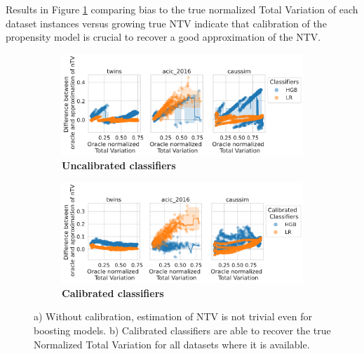 \documentclass{report}
\begin{document}
\begin{appendices}
  Results in Figure \ref{apd:overlap:ntv_approximation} comparing bias to the true
  normalized Total Variation of each dataset instances versus growing true NTV
  indicate that calibration of the propensity model is crucial to recover a good
  approximation of the NTV.




  \begin{figure}
    \begin{subfigure}[b]{\textwidth}
      \centering
      \caption{\textbf{Uncalibrated classifiers}}
      \includegraphics[width=\linewidth]{img/chapter_5/overlap_measure_diff_oracle_ntv_to_n_tv_calibration=False_vs_oracle_n_tv.pdf}
    \end{subfigure}
    \begin{subfigure}[b]{\textwidth}
      \centering
      \caption{\textbf{Calibrated
          classifiers}}
      \includegraphics[width=\linewidth]{img/chapter_5/overlap_measure_diff_oracle_ntv_to_n_tv_calibration=True_vs_oracle_n_tv.pdf}
    \end{subfigure}
    \caption{a) Without calibration, estimation of NTV is not trivial even for
      boosting models. b) Calibrated classifiers are able to recover the true
      Normalized Total Variation for all datasets where it is
      available.}\label{apd:overlap:ntv_approximation}
  \end{figure}




\end{appendices}
\end{document}
